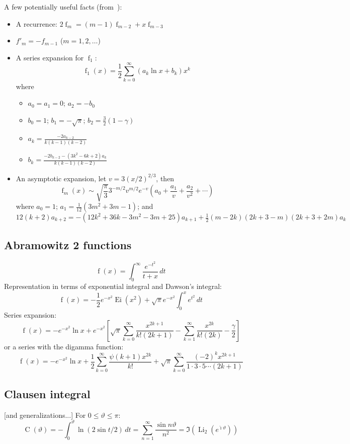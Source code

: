 \documentclass[10pt,dvipdfmx,letterpaper,twoside]{article}
\let\O=\operatorname
\newcommand{\ii}{{\hat{\imath}}}
\newenvironment{implementation}{\noindent\begin{framed}}{\end{framed}}
\let\theta=\vartheta
\begin{document}
\begin{implementation}
A few potentially useful facts (from~\cite{a&s}):
\begin{itemize}
\item A recurrence: $2\O{f}_m = (m-1)\O{f}_{m-2} + x\O{f}_{m-3}$
\item $f'_m = -f_{m-1}$ ($m=1,2,\dots$)
\item A series expansion for $\O{f}_1$:
  \[ \O{f}_1(x) = \frac12\sum_{k=0}^\infty(a_k\ln x + b_k)x^k\]
  where
  \begin{itemize}
  \item $a_0 = a_1 = 0$; $a_2 = -b_0$
  \item $b_0 = 1$; $b_1 = -\sqrt\pi$; $b_2 = \tfrac32(1-\gamma)$
  \item $a_k = \frac{-2a_{k-2}}{k(k-1)(k-2)}$
  \item $b_k = \frac{-2b_{k-2} - (3k^2-6k+2)a_k}{k(k-1)(k-2)}$
  \end{itemize}
\item An asymptotic expansion, let $v=3(x/2)^{2/3}$, then
  \[ \O{f}_{m}(x) \sim \sqrt{\frac\pi3}3^{-m/2}v^{m/2}e^{-v}\left(a_0 + \frac{a_1}{v} + \frac{a_2}{v^2} + \cdots \right) \]
  where $a_0 = 1$; $a_1 = \tfrac{1}{12}(3m^2+3m-1)$; and
  $12(k+2)a_{k+2} = -(12k^2+36k-3m^2-3m+25)a_{k+1} + \tfrac12(m-2k)(2k+3-m)(2k+3+2m)a_k$
\end{itemize}
\end{implementation}

\subsection{Abramowitz 2 functions}
\[ \O{f}(x) = \int_0^\infty\frac{e^{-t^2}}{t+x}\,dt \]
Representation in terms of exponential integral and Dawson's integral:
\[ \O{f}(x) = -\frac12e^{-x^2}\O{Ei}(x^2) + \sqrt{\pi}e^{-x^2}\int_0^x e^{t^2}\,dt \]
Series expansion:
\[ \O{f}(x) = -e^{-x^2}\ln x + e^{-x^2}\left[ \sqrt{\pi}\sum_{k=0}^\infty \frac{x^{2k+1}}{k!(2k+1)}
    - \sum_{k=1}^\infty \frac{x^{2k}}{k!(2k)} - \frac\gamma2 \right] \]
or a series with the digamma function:
\[ \O{f}(x) = -e^{-x^2}\ln x + \frac12\sum_{k=0}^\infty\frac{\psi(k+1)x^{2k}}{k!}
    + \sqrt{\pi}\sum_{k=0}^\infty\frac{(-2)^k x^{2k+1}}{1\cdot3\cdot5\cdots(2k+1)} \]

\subsection{Clausen integral}
[and generalizations...]
For $0\leq\theta\leq\pi$:
\[ \O{C}(\theta) = -\int_0^\theta \ln(2\sin t/2)\,dt = \sum_{n=1}^\infty \frac{\sin n\theta}{n^2} = \Im(\O{Li}_2(e^{\ii\theta}))\]
\end{document}
